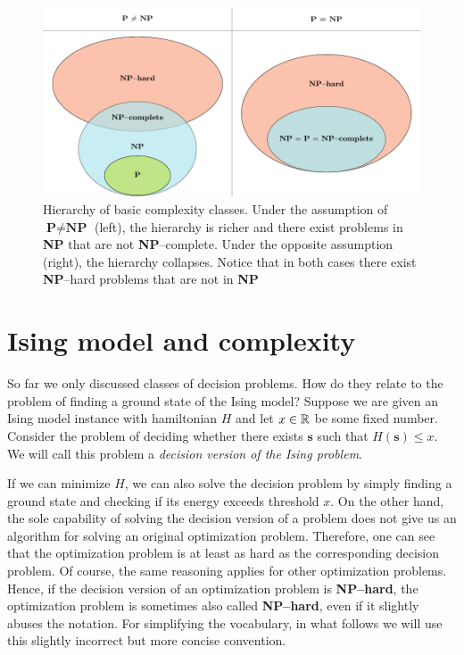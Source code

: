 \begin{figure}
    \includegraphics[width=\textwidth]{figures/complexity_new.pdf}
    \caption{Hierarchy of basic complexity classes. Under the assumption of $\textbf{P} \ne \textbf{NP}$ (left), the hierarchy is richer and there exist problems in \textbf{NP}  that are not \textbf{NP}--complete. Under the opposite assumption (right), the hierarchy collapses. Notice that in both cases there exist \textbf{NP}--hard problems that are not in \textbf{NP}
    }
    \label{fig:complexity}
\end{figure}



\section{Ising model and complexity}

So far we only discussed classes of decision problems. How do they relate to the problem of
finding a ground state of the Ising model? Suppose we are given an Ising model instance with
hamiltonian $H$ and let $x \in \mathbb{R}$ be some fixed number. Consider the problem of deciding whether
there exists $\mathbf{s}$ such that $H(\mathbf{s}) \le x$. We will call this problem a
\emph{decision version of the Ising problem}. 

If we can minimize $H$, we can also solve the decision problem by simply finding a ground state and
checking if its energy exceeds threshold $x$. On the other hand, the sole capability of solving the
decision version of a problem does not give us an algorithm for solving an original optimization
problem. Therefore, one can see that the optimization problem is at least as hard as the
corresponding decision problem. Of course, the same reasoning applies for other optimization
problems. Hence, if the decision version of an optimization problem is \textbf{NP--hard},
the optimization problem is sometimes also called \textbf{NP--hard}, even if it slightly abuses the
notation. For simplifying the vocabulary, in what follows we will use this slightly
incorrect but more concise convention.

